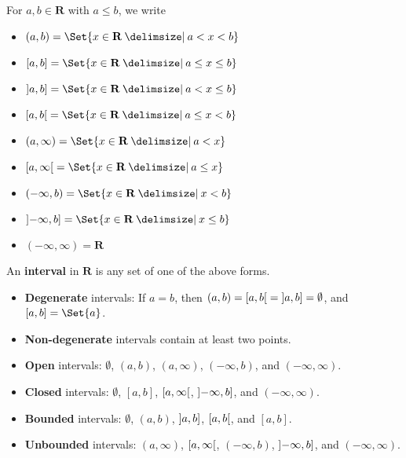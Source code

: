 \begin{Definition}{}{}
    For $ a,b\in\mathbf{R} $ with $ a\le b $, we write
    \begin{itemize}
        \item $ (a,b)=\Set{x\in\mathbf{R}\given a<x<b} $
        \item $ [a,b]=\Set{x\in\mathbf{R}\given a\le x\le b} $
        \item $ \interval[open left]{a}{b}=\Set{x\in\mathbf{R}\given a<x\le b} $
        \item $ \interval[open right]{a}{b}=\Set{x\in\mathbf{R}\given a\le x< b} $
        \item $ (a,\infty)=\Set{x\in\mathbf{R}\given a<x} $
        \item $ \interval[open right]{a}{\infty}=\Set{x\in\mathbf{R}\given a\le x} $
        \item $ (-\infty,b)=\Set{x\in\mathbf{R}\given x<b} $
        \item $ \interval[open left]{-\infty}{b}=\Set{x\in\mathbf{R}\given x\le b} $
        \item $ (-\infty,\infty)=\mathbf{R} $
    \end{itemize}
    An \textbf{interval} in $ \mathbf{R} $ is any set
    of one of the above forms.

    \begin{itemize}
        \item \textbf{Degenerate} intervals: If $ a=b $, then
              $ (a,b)=\interval[open right]{a}{b}=\interval[open left]{a}{b}=\emptyset $,
              and $ [a,b]=\Set{a} $.
        \item \textbf{Non-degenerate} intervals
              contain at least two points.
        \item \textbf{Open} intervals:
              $ \emptyset $, $ (a,b) $, $ (a,\infty) $, $ (-\infty,b) $, and
              $ (-\infty,\infty) $.
        \item \textbf{Closed} intervals:
              $ \emptyset $, $ [a,b] $,
              $ \interval[open right]{a}{\infty} $, $ \interval[open left]{-\infty}{b} $,
              and $ (-\infty,\infty) $.
        \item \textbf{Bounded} intervals:
              $ \emptyset $, $ (a,b) $, $ \interval[open left]{a}{b} $,
              $ \interval[open right]{a}{b} $, and $ [a,b] $.
        \item \textbf{Unbounded} intervals: $ (a,\infty) $, $ \interval[open right]{a}{\infty} $,
              $ (-\infty,b) $, $ \interval[open left]{-\infty}{b} $,
              and $ (-\infty,\infty) $.
    \end{itemize}
\end{Definition}
